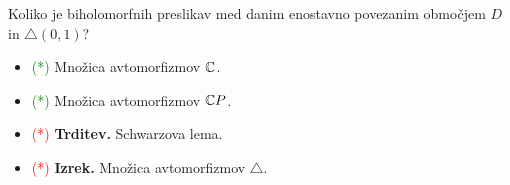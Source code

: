 \begin{enumerate}
    Koliko je biholomorfnih preslikav med danim enostavno povezanim območjem \(D\) in \(\triangle(0, 1)\)?
    \begin{itemize}
        \item \textcolor{green}{(*)} Množica avtomorfizmov \(\mathbb{C}\).
        \item \textcolor{green}{(*)} Množica avtomorfizmov \(\mathbb{C} P\).
        \item \textcolor{red}{(*)} \textbf{Trditev.} Schwarzova lema.
        \item \textcolor{red}{(*)} \textbf{Izrek.} Množica avtomorfizmov \(\triangle\).
    \end{itemize}
\end{enumerate}